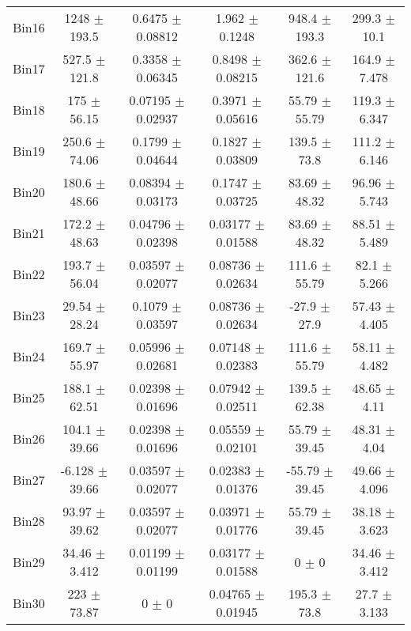 \begin{tabular}{@{\extracolsep{4pt}}lccccc@{}}
     Bin16 & 1248 $\pm$ 193.5 & 0.6475 $\pm$ 0.08812 & 1.962 $\pm$ 0.1248 & 948.4 $\pm$ 193.3 & 299.3 $\pm$ 10.1 \\ 
     Bin17 & 527.5 $\pm$ 121.8 & 0.3358 $\pm$ 0.06345 & 0.8498 $\pm$ 0.08215 & 362.6 $\pm$ 121.6 & 164.9 $\pm$ 7.478 \\ 
     Bin18 & 175 $\pm$ 56.15 & 0.07195 $\pm$ 0.02937 & 0.3971 $\pm$ 0.05616 & 55.79 $\pm$ 55.79 & 119.3 $\pm$ 6.347 \\ 
     Bin19 & 250.6 $\pm$ 74.06 & 0.1799 $\pm$ 0.04644 & 0.1827 $\pm$ 0.03809 & 139.5 $\pm$ 73.8 & 111.2 $\pm$ 6.146 \\ 
     Bin20 & 180.6 $\pm$ 48.66 & 0.08394 $\pm$ 0.03173 & 0.1747 $\pm$ 0.03725 & 83.69 $\pm$ 48.32 & 96.96 $\pm$ 5.743 \\ 
     Bin21 & 172.2 $\pm$ 48.63 & 0.04796 $\pm$ 0.02398 & 0.03177 $\pm$ 0.01588 & 83.69 $\pm$ 48.32 & 88.51 $\pm$ 5.489 \\ 
     Bin22 & 193.7 $\pm$ 56.04 & 0.03597 $\pm$ 0.02077 & 0.08736 $\pm$ 0.02634 & 111.6 $\pm$ 55.79 & 82.1 $\pm$ 5.266 \\ 
     Bin23 & 29.54 $\pm$ 28.24 & 0.1079 $\pm$ 0.03597 & 0.08736 $\pm$ 0.02634 & -27.9 $\pm$ 27.9 & 57.43 $\pm$ 4.405 \\ 
     Bin24 & 169.7 $\pm$ 55.97 & 0.05996 $\pm$ 0.02681 & 0.07148 $\pm$ 0.02383 & 111.6 $\pm$ 55.79 & 58.11 $\pm$ 4.482 \\ 
     Bin25 & 188.1 $\pm$ 62.51 & 0.02398 $\pm$ 0.01696 & 0.07942 $\pm$ 0.02511 & 139.5 $\pm$ 62.38 & 48.65 $\pm$ 4.11 \\ 
     Bin26 & 104.1 $\pm$ 39.66 & 0.02398 $\pm$ 0.01696 & 0.05559 $\pm$ 0.02101 & 55.79 $\pm$ 39.45 & 48.31 $\pm$ 4.04 \\ 
     Bin27 & -6.128 $\pm$ 39.66 & 0.03597 $\pm$ 0.02077 & 0.02383 $\pm$ 0.01376 & -55.79 $\pm$ 39.45 & 49.66 $\pm$ 4.096 \\ 
     Bin28 & 93.97 $\pm$ 39.62 & 0.03597 $\pm$ 0.02077 & 0.03971 $\pm$ 0.01776 & 55.79 $\pm$ 39.45 & 38.18 $\pm$ 3.623 \\ 
     Bin29 & 34.46 $\pm$ 3.412 & 0.01199 $\pm$ 0.01199 & 0.03177 $\pm$ 0.01588 & 0 $\pm$ 0 & 34.46 $\pm$ 3.412 \\ 
     Bin30 & 223 $\pm$ 73.87 & 0 $\pm$ 0 & 0.04765 $\pm$ 0.01945 & 195.3 $\pm$ 73.8 & 27.7 $\pm$ 3.133 \\ 
\hline\hline
  \end{tabular}
